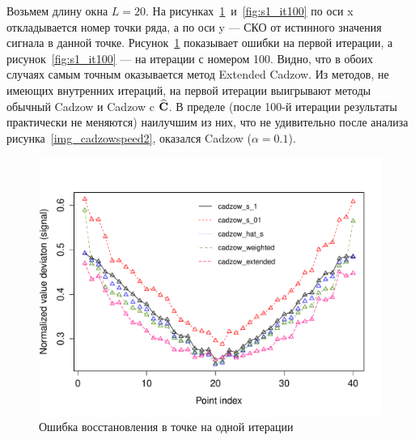 \documentclass[12pt,a4paper,fleqn,leqno]{article}
\begin{document}
Возьмем длину окна $L=20$.  На рисунках~\ref{fig:s1_it1}~и~\ref{fig:s1_it100} по оси x откладывается номер точки ряда,
а по оси y --- СКО от истинного значения сигнала в данной точке. Рисунок~\ref{fig:s1_it1} показывает ошибки на первой итерации,
а рисунок~\ref{fig:s1_it100} --- на итерации с номером 100.
Видно, что в обоих случаях самым точным оказывается метод Extended Cadzow. Из методов, не имеющих внутренних итераций,
на первой итерации выигрывают методы обычный Cadzow и Cadzow c $\widehat{\mathbf{C}}$. В пределе (после 100-й итерации результаты практически не меняются)
наилучшим из них, что не удивительно после анализа рисунка~\ref{img_cadzowspeed2}, оказался Cadzow ($\alpha=0.1$). 

\begin{figure}[!hhh]
\begin{center}
\includegraphics[width = 13cm]{s1_it1.pdf}
\caption{Ошибка восстановления в точке на одной итерации}
\label{fig:s1_it1}
\end{center}
\end{figure}

\end{document}
